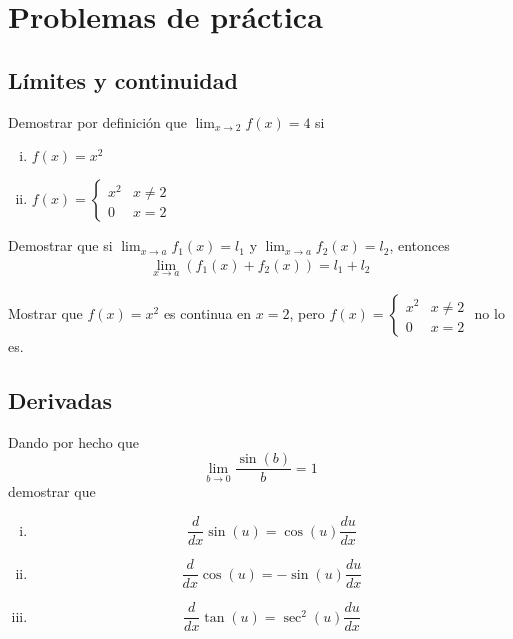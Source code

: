 \section{Problemas de práctica}

\subsection{Límites y continuidad}

\begin{problema}
	Demostrar por definición que $\lim_{x\to 2}f(x)=4$ si
	\begin{enumerate}[(i)]
		\item $f(x)=x^{2}$

		\item $f(x)= \begin{cases}
			x^{2} & x\neq 2 \\
			0 & x =2
		\end{cases}$
	\end{enumerate}
\end{problema}


\begin{problema}
	Demostrar que si $\lim_{x\to a}f_{1}(x)=l_{1}$ y $\lim_{x\to a}f_{2}(x)=l_{2}$, entonces
	\begin{align*}
		\lim_{x\to a}\left( f_{1}(x)+f_{2}(x) \right)=l_{1}+l_{2}
	\end{align*}
\end{problema}

\begin{problema}
	Mostrar que $f(x)=x^{2}$ es continua en $x=2$, pero $f(x)= \begin{cases}
		x^{2} & x\neq 2 \\
		0 & x =2
	\end{cases}$ no lo es.
\end{problema}

\subsection{Derivadas}

\begin{problema}
	Dando por hecho que \[\lim_{b\to 0}\dfrac{\sin(b)}{b}=1\] demostrar que
	\begin{enumerate}[(i)]
		\item \[\dfrac{d}{dx}\sin(u)=\cos(u)\dfrac{du}{dx}\]
		\item \[\dfrac{d}{dx}\cos(u)=-\sin(u)\dfrac{du}{dx}\]
		\item \[\dfrac{d}{dx}\tan(u)=\sec^{2}(u)\dfrac{du}{dx}\]

	\end{enumerate}
\end{problema}


